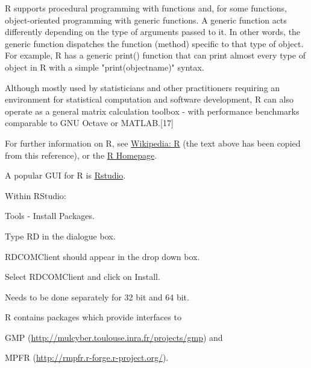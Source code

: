 \vpara
R supports procedural programming with functions and, for some functions, object-oriented programming with generic functions. A generic function acts differently depending on the type of arguments passed to it. In other words, the generic function dispatches the function (method) specific to that type of object. For example, R has a generic print() function that can print almost every type of object in R with a simple "print(objectname)" syntax.

\vpara
Although mostly used by statisticians and other practitioners requiring an environment for statistical computation and software development, R can also operate as a general matrix calculation toolbox - with performance benchmarks comparable to GNU Octave or MATLAB.[17]

\vpara
For further information on R, see \href{http://en.wikipedia.org/wiki/R_(programming_language)}{Wikipedia: R} (the text above has been copied from this reference), or the  \href{http://www.r-project.org/}{R Homepage}.

%
%
%
%

\vpara
A popular GUI for R is \href{http://www.rstudio.com/}{Rstudio}.

Within RStudio:

Tools - Install Packages.

Type RD in the dialogue box.

RDCOMClient should appear in the drop down box.

Select RDCOMClient and click on Install.

Needs to be done separately for 32 bit and 64 bit.

\vpara
R contains packages which provide interfaces to 

GMP (\href{http://mulcyber.toulouse.inra.fr/projects/gmp}{http://mulcyber.toulouse.inra.fr/projects/gmp}) and 

MPFR (\href{http://rmpfr.r-forge.r-project.org/}{http://rmpfr.r-forge.r-project.org/}). 

